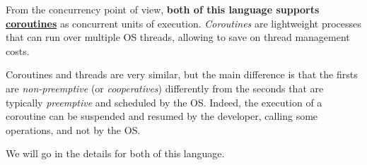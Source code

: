 From the concurrency point of view, \textbf{both of this language supports \href{https://en.wikipedia.org/wiki/Coroutine}{coroutines}} as concurrent units of execution. \textit{Coroutines} are lightweight processes that can run over multiple OS threads, allowing to save on thread management costs.

Coroutines and threads are very similar, but the main difference is that the firsts are \textit{non-preemptive} (or \textit{cooperatives}) differently from the seconds that are typically \textit{preemptive} and scheduled by the OS. Indeed, the execution of a coroutine can be suspended and resumed by the developer, calling some operations, and not by the OS.

We will go in the details for both of this language.